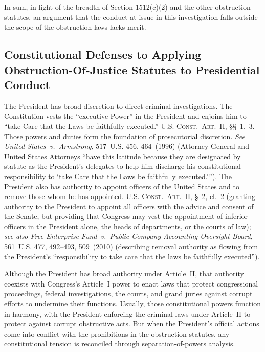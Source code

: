 \hr

In sum, in light of the breadth of Section 1512(c)(2) and the other obstruction statutes, an argument that the conduct at issue in this investigation falls outside the scope of the obstruction laws lacks merit.

\subsection{Constitutional Defenses to Applying Obstruction-Of-Justice Statutes to Presidential Conduct}

The President has broad discretion to direct criminal investigations.
The Constitution vests the ``executive Power'' in the President and enjoins him to ``take Care that the Laws be faithfully executed.'' \textsc{U.S. Const.\ Art.~II}, \S\S~1,~3.
Those powers and duties form the foundation of prosecutorial discretion.
\textit{See United States~v.\ Armstrong}, 517~U.S. 456, 464~(1996) (Attorney General and United States Attorneys ``have this latitude because they are designated by statute as the President's delegates to help him discharge his constitutional responsibility to `take Care that the Laws be faithfully executed.'\thinspace'').
The President also has authority to appoint officers of the United States and to remove those whom he has appointed.
\textsc{U.S. Const.\ Art.~II}, \S~2, cl.~2 (granting authority to the President to appoint all officers with the advice and consent of the Senate, but providing that Congress may vest the appointment of inferior officers in the President alone, the heads of departments, or the courts of law);
\textit{see also Free Enterprise Fund~v.\ Public Company Accounting Oversight Board}, 561~U.S. 477, 492--493, 509~(2010) (describing removal authority as flowing from the President's ``responsibility to take care that the laws be faithfully executed'').

Although the President has broad authority under Article~II, that authority coexists with Congress's Article~I power to enact laws that protect congressional proceedings, federal investigations, the courts, and grand juries against corrupt efforts to undermine their functions.
Usually, those constitutional powers function in harmony, with the President enforcing the criminal laws under Article~II to protect against corrupt obstructive acts.
But when the President's official actions come into conflict with the prohibitions in the obstruction statutes, any constitutional tension is reconciled through separation-of-powers analysis.

